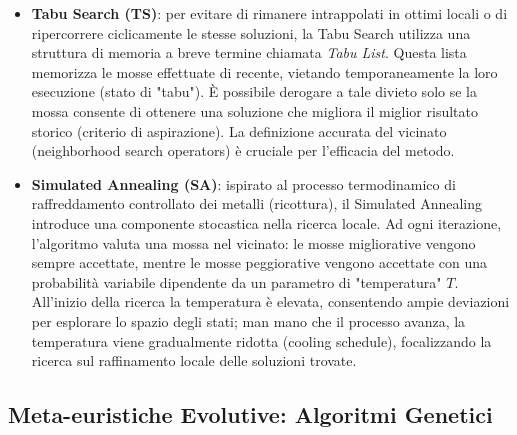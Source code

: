 \begin{itemize}
    \item \textbf{Tabu Search (TS)}: per evitare di rimanere intrappolati in ottimi locali o di ripercorrere ciclicamente le stesse soluzioni, la Tabu Search utilizza una struttura di memoria a breve termine chiamata \textit{Tabu List}. Questa lista memorizza le mosse effettuate di recente, vietando temporaneamente la loro esecuzione (stato di "tabu"). È possibile derogare a tale divieto solo se la mossa consente di ottenere una soluzione che migliora il miglior risultato storico (criterio di aspirazione). La definizione accurata del vicinato (neighborhood search operators) è cruciale per l'efficacia del metodo.
    \item \textbf{Simulated Annealing (SA)}: ispirato al processo termodinamico di raffreddamento controllato dei metalli (ricottura), il Simulated Annealing introduce una componente stocastica nella ricerca locale. Ad ogni iterazione, l'algoritmo valuta una mossa nel vicinato: le mosse migliorative vengono sempre accettate, mentre le mosse peggiorative vengono accettate con una probabilità variabile dipendente da un parametro di "temperatura" $T$. All'inizio della ricerca la temperatura è elevata, consentendo ampie deviazioni per esplorare lo spazio degli stati; man mano che il processo avanza, la temperatura viene gradualmente ridotta (cooling schedule), focalizzando la ricerca sul raffinamento locale delle soluzioni trovate.
\end{itemize}

\subsection{Meta-euristiche Evolutive: Algoritmi Genetici}
\label{subsec:metaeuristiche-evolutive-cap2}

